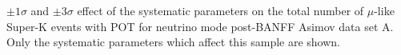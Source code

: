 \begin{table}	
	\begin{adjustbox}{width=\textwidth, totalheight=\textheight, keepaspectratio}
		
	\end{adjustbox}
	\caption
	{
		$\pm1\sigma$ and $\pm3\sigma$ effect of the systematic parameters on the total number of $\mu$-like Super-K events with \RunPeriod POT for neutrino mode post-BANFF Asimov data set A. Only the systematic parameters which affect this sample are shown.
	}
\end{table}\clearpage